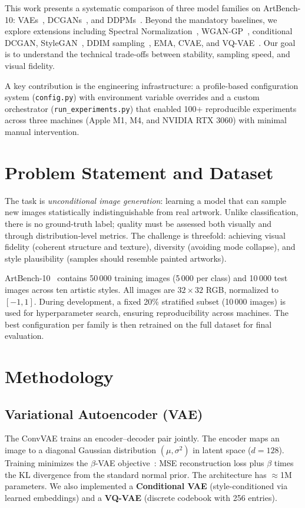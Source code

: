 \documentclass[runningheads]{llncs}
\begin{document}
This work presents a systematic comparison of three model families on ArtBench-10: VAEs~\cite{kingma2013}, DCGANs~\cite{radford2015}, and DDPMs~\cite{ho2020}. Beyond the mandatory baselines, we explore extensions including Spectral Normalization~\cite{miyato2018}, WGAN-GP~\cite{gulrajani2017}, conditional DCGAN, StyleGAN~\cite{karras2018}, DDIM sampling~\cite{song2020}, EMA, CVAE, and VQ-VAE~\cite{oord2017}. Our goal is to understand the technical trade-offs between stability, sampling speed, and visual fidelity.

A key contribution is the engineering infrastructure: a profile-based configuration system (\texttt{config.py}) with environment variable overrides and a custom orchestrator (\texttt{run\_experiments.py}) that enabled 100+ reproducible experiments across three machines (Apple M1, M4, and NVIDIA RTX 3060) with minimal manual intervention.

\section{Problem Statement and Dataset}\label{sec:problem}

The task is \emph{unconditional image generation}: learning a model that can sample new images statistically indistinguishable from real artwork. Unlike classification, there is no ground-truth label; quality must be assessed both visually and through distribution-level metrics. The challenge is threefold: achieving visual fidelity (coherent structure and texture), diversity (avoiding mode collapse), and style plausibility (samples should resemble painted artworks).

ArtBench-10~\cite{liao2022} contains 50\,000 training images (5\,000 per class) and 10\,000 test images across ten artistic styles. All images are $32 \times 32$ RGB, normalized to $[-1, 1]$. During development, a fixed 20\% stratified subset (10\,000 images) is used for hyperparameter search, ensuring reproducibility across machines. The best configuration per family is then retrained on the full dataset for final evaluation.

\section{Methodology}\label{sec:methodology}

\subsection{Variational Autoencoder (VAE)}
The ConvVAE trains an encoder--decoder pair jointly. The encoder maps an image to a diagonal Gaussian distribution $(\mu, \sigma^2)$ in latent space ($d=128$). Training minimizes the $\beta$-VAE objective~\cite{higgins2017}: MSE reconstruction loss plus $\beta$ times the KL divergence from the standard normal prior. The architecture has $\approx$1M parameters. We also implemented a \textbf{Conditional VAE} (style-conditioned via learned embeddings) and a \textbf{VQ-VAE} (discrete codebook with 256 entries).
\end{document}
